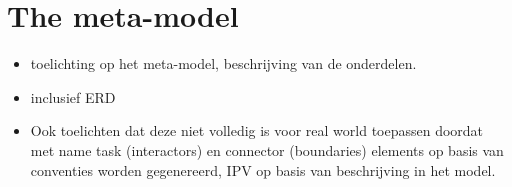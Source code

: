 \section{The meta-model} \label{sec:artifact_meta_model}

\begin{itemize}
    \item toelichting op het meta-model, beschrijving van de onderdelen.
    \item inclusief ERD
    \item Ook toelichten dat deze niet volledig is voor real world toepassen doordat
    met name task (interactors) en connector (boundaries) elements op basis van conventies
    worden gegenereerd, IPV op basis van beschrijving in het model.
\end{itemize}